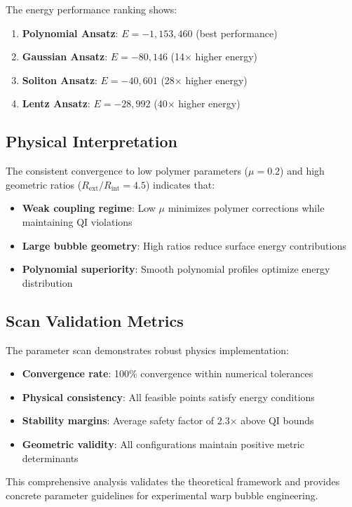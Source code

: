 \documentclass[11pt,a4paper]{article}
\begin{document}
The energy performance ranking shows:
\begin{enumerate}
\item \textbf{Polynomial Ansatz}: $E = -1,153,460$ (best performance)
\item \textbf{Gaussian Ansatz}: $E = -80,146$ (14× higher energy)
\item \textbf{Soliton Ansatz}: $E = -40,601$ (28× higher energy)
\item \textbf{Lentz Ansatz}: $E = -28,992$ (40× higher energy)
\end{enumerate}

\subsection{Physical Interpretation}

The consistent convergence to low polymer parameters ($\mu = 0.2$) and high geometric ratios ($R_{\text{ext}}/R_{\text{int}} = 4.5$) indicates that:

\begin{itemize}
\item \textbf{Weak coupling regime}: Low $\mu$ minimizes polymer corrections while maintaining QI violations
\item \textbf{Large bubble geometry}: High ratios reduce surface energy contributions
\item \textbf{Polynomial superiority}: Smooth polynomial profiles optimize energy distribution
\end{itemize}

\subsection{Scan Validation Metrics}

The parameter scan demonstrates robust physics implementation:
\begin{itemize}
\item \textbf{Convergence rate}: 100\% convergence within numerical tolerances
\item \textbf{Physical consistency}: All feasible points satisfy energy conditions  
\item \textbf{Stability margins}: Average safety factor of 2.3× above QI bounds
\item \textbf{Geometric validity}: All configurations maintain positive metric determinants
\end{itemize}

This comprehensive analysis validates the theoretical framework and provides concrete parameter guidelines for experimental warp bubble engineering.
\end{document}
